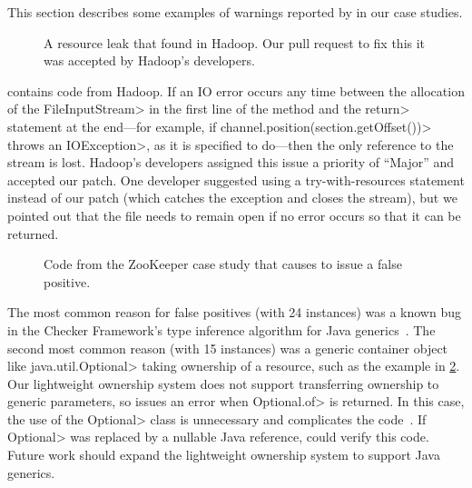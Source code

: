 This section describes some examples of warnings reported by \tool
in our case studies.

\begin{figure}
  
  \prefigcaption
  \caption{A resource leak that \tool found in Hadoop. Our pull request
    to fix this it was accepted by Hadoop's developers.}
  \label{fig:hadoop-bug}
\end{figure}

 contains code from Hadoop. If an IO error
occurs any time between the allocation of the \<FileInputStream>
in the first line of the method and the \<return> statement
at the end---for example, if \<channel.position(section.getOffset())>
throws an \<IOException>, as it is specified to do---then the
only reference to the stream is lost. Hadoop's developers
assigned this issue a priority of ``Major'' and accepted our
patch.
One developer suggested using a try-with-resources statement instead
of our patch (which catches the exception and closes the stream),
but we pointed out that
the file needs to remain open if no error occurs so that it can be
returned.

\begin{figure}
  
  \prefigcaption
  \caption{Code from the ZooKeeper case study that causes \tool
  to issue a false positive.}
  \label{fig:zookeeper-optional}
\end{figure}

The most common reason for false
positives (with 24 instances) was
a known bug in the Checker Framework’s
type inference algorithm for Java generics~\cite{issue979}.
The second most common reason (with 15 instances)
was a generic container object like \<java.util.Optional> taking ownership of a resource, such
as the example in \cref{fig:zookeeper-optional}. Our lightweight ownership
system does not support transferring ownership to generic parameters,
so \tool issues an error when \<Optional.of> is returned. In this case, the use
of the \<Optional> class is unnecessary and complicates the
code~\cite{ErnstNothingIsBetterThanOptional}.  If \<Optional> was replaced
by a nullable Java reference,
\tool could verify this code. Future work should expand the lightweight ownership system to
support Java generics.

